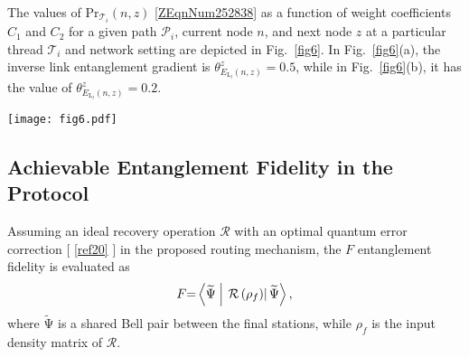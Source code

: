 \documentclass[11pt]{article}%
\newcommand{\fref}[1]{Fig.~\ref{#1}}
\newcommand*{\cref}[1]{%
  \begingroup
    \hypersetup{
      linkcolor=linkequation,
      linkbordercolor=linkequation,
    }%
    \ref{#1}%
  \endgroup
}
\begin{document}
 The values of $\mathrm{P}{\mathrm{r}}_{{\mathcal{T}}_i}\left(n,z\right)$ \eqref{ZEqnNum252838} as a function of weight coefficients $C_{\mathrm{1}}$ and $C_{\mathrm{2}}$ for a given path ${\mathcal{P}}_i$, current node $n$, and next node $z$ at a particular thread ${\mathcal{T}}_i$ and network setting are depicted in \fref{fig6}. In \fref{fig6}(a), the inverse link entanglement gradient is ${\theta }^z_{E_{{\mathrm{L}}_l}\left(n,z\right)}\mathrm{=0.5}$, while in \fref{fig6}(b), it has the value of ${\theta }^z_{E_{{\mathrm{L}}_l}\left(n,z\right)}\mathrm{=0.2}$. 

\begin{figure*}[h!]
\vspace{-0.6cm}
 \begin{center}
 	 \texttt{[image: fig6.pdf]}

\caption{(a):The $\mathrm{P}{\mathrm{r}}_{{\mathcal{T}}_i}\left(n,z\right)$ probability of selecting a next node $z$ from a current node $n$ for a given path ${\mathcal{P}}_i$, $\mathrm{0}\mathrm{\le }C_{\mathrm{1}}\mathrm{\le }\mathrm{1}$ and $\mathrm{0}\mathrm{\le }C_{\mathrm{2}}\mathrm{\le }\mathrm{1}$, at a setting of ${\theta }^z_{E_{{\mathrm{L}}_l}\left(n,z\right)}\mathrm{=0.5}$, $\psi \left(n,z\right)\mathrm{=5}$, $k\mathrm{=5}$, and at (b): ${\theta }^{z}_{{E}_{{\mathrm{L}}_{l}}\left(n,z\right)}\mathrm{=0.2}$, $\psi \left(n,z\right)\mathrm{=5}$, $k\mathrm{=5}$.}
\label{fig6}
\end{center}
\end{figure*}
 
\subsection{Achievable Entanglement Fidelity in the Protocol}

 Assuming an ideal recovery operation $\mathcal{R}$ with an optimal quantum error correction [\cref{ref20}] in the proposed routing mechanism, the $F$ entanglement fidelity is evaluated as 
\begin{equation} \label{ZEqnNum896752} 
F\mathrm{=}\left\langle \widetilde{\mathrm{\Psi }}\mathrel{\left|\vphantom{\widetilde{\mathrm{\Psi }} \left.\mathcal{R}\left({\rho }_f\right)\right|\widetilde{\mathrm{\Psi }}}\right.\kern-\nulldelimiterspace}\left.\mathcal{R}\left({\rho }_f\right)\right|\widetilde{\mathrm{\Psi }}\right\rangle ,                                                                                      
\end{equation} 
where $\widetilde{\mathrm{\Psi }}$ is a shared Bell pair between the final stations, while ${\rho }_f$ is the input density matrix of $\mathcal{R}$. 
\end{document}
